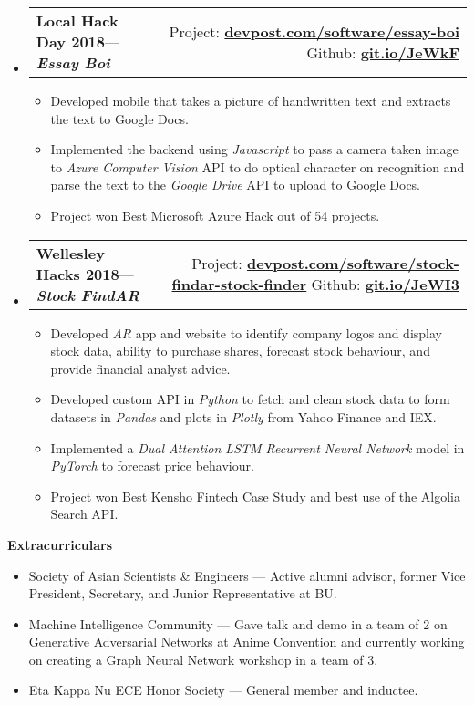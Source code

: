 \documentclass[letterpaper, 8pt]{extarticle}
\makeatletter
\newcommand{\resitem}[1]{\item #1 \vspace{-2pt}}
\newcommand{\resheading}[1]{{\large \colorbox{mygrey}{\begin{minipage}{0.99\textwidth}{\textbf{#1 \vphantom{p\^{E}}}}\end{minipage}}}}
\newcommand{\smallressubheading}[4]{
\begin{tabular*}{7.40in}{l@{\extracolsep{\fill}}r}
    \textbf{#1}\space\space --- \textit{\textbf{#2}}& #3 \\
\end{tabular*}\vspace{-6pt}}
\newcommand{\genlink}[1]{\href{https://www.#1}{\textbf{#1}}} %
\makeatother
\begin{document}
\begin{itemize}
\item
    \smallressubheading{Local Hack Day 2018}{Essay Boi}{Project: \genlink{devpost.com/software/essay-boi} \space Github: \genlink{git.io/JeWkF}}\\
    \begin{itemize}
        \resitem{Developed mobile that takes a picture of handwritten text and extracts the text to Google Docs.}
        \resitem{Implemented the backend using \emph{Javascript} to pass a camera taken image to \emph{Azure Computer Vision} API to do optical character on recognition and parse the text to the \emph{Google Drive} API to upload to Google Docs.}
        \resitem{Project won Best Microsoft Azure Hack out of 54 projects.}
    \end{itemize}
    
\item
    \smallressubheading{Wellesley Hacks 2018}{Stock FindAR}{Project: \genlink{devpost.com/software/stock-findar-stock-finder} \space Github: \genlink{git.io/JeWI3}}\\
    \begin{itemize}
        \resitem{Developed \emph{AR} app and website to identify company logos and display stock data, ability to purchase shares, forecast stock behaviour, and provide financial analyst advice.}
        \resitem{Developed custom API in \emph{Python} to fetch and clean stock data to form datasets in \emph{Pandas} and plots in \emph{Plotly} from Yahoo Finance and IEX.}
        \resitem{Implemented a \emph{Dual Attention LSTM Recurrent Neural Network} model in \emph{PyTorch} to forecast price behaviour.}
        \resitem{Project won Best Kensho Fintech Case Study and best use of the Algolia Search API.}
    \end{itemize}
\end{itemize}

\resheading{Extracurriculars}
\begin{itemize}
    \item Society of Asian Scientists \& Engineers --- Active alumni advisor, former Vice President, Secretary, and Junior Representative at BU. 
    \item Machine Intelligence Community --- Gave talk and demo in a team of 2 on Generative Adversarial Networks at Anime Convention and currently working on creating a Graph Neural Network workshop in a team of 3.
    \item Eta Kappa Nu ECE Honor Society --- General member and inductee.
\end{itemize}
\end{document}
